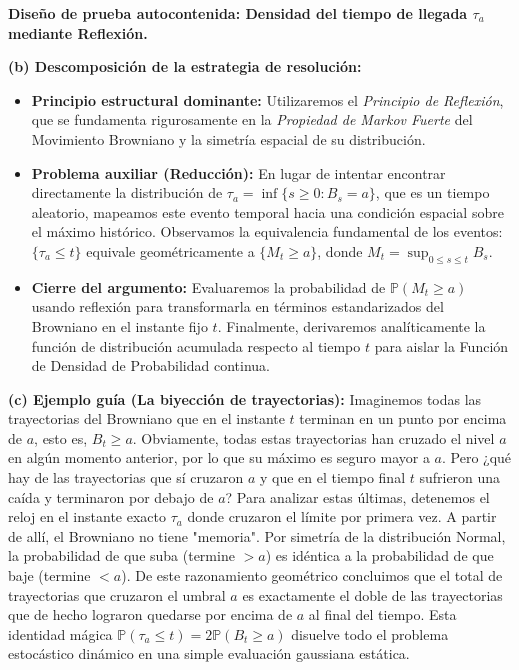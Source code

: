 \documentclass[11pt, letterpaper]{article}
\begin{document}
\begin{solucion}
    \textbf{Diseño de prueba autocontenida: Densidad del tiempo de llegada $\tau_a$ mediante Reflexión.}

    \textbf{(b) Descomposición de la estrategia de resolución:}
    \begin{itemize}
        \item[(i)] \textbf{Principio estructural dominante:} Utilizaremos el \textit{Principio de Reflexión}, que se fundamenta rigurosamente en la \textit{Propiedad de Markov Fuerte} del Movimiento Browniano y la simetría espacial de su distribución.
        \item[(ii)] \textbf{Problema auxiliar (Reducción):} En lugar de intentar encontrar directamente la distribución de $\tau_a = \inf\{s \ge 0 : B_s = a\}$, que es un tiempo aleatorio, mapeamos este evento temporal hacia una condición espacial sobre el máximo histórico. Observamos la equivalencia fundamental de los eventos: $\{\tau_a \le t\}$ equivale geométricamente a $\{M_t \ge a\}$, donde $M_t = \sup_{0 \le s \le t} B_s$. 
        \item[(iii)] \textbf{Cierre del argumento:} Evaluaremos la probabilidad de $\mathbb{P}(M_t \ge a)$ usando reflexión para transformarla en términos estandarizados del Browniano en el instante fijo $t$. Finalmente, derivaremos analíticamente la función de distribución acumulada respecto al tiempo $t$ para aislar la Función de Densidad de Probabilidad continua.
    \end{itemize}

    \vspace{3mm}
    \textbf{(c) Ejemplo guía (La biyección de trayectorias):}
    Imaginemos todas las trayectorias del Browniano que en el instante $t$ terminan en un punto por encima de $a$, esto es, $B_t \ge a$. Obviamente, todas estas trayectorias han cruzado el nivel $a$ en algún momento anterior, por lo que su máximo es seguro mayor a $a$. 
    Pero ¿qué hay de las trayectorias que sí cruzaron $a$ y que en el tiempo final $t$ sufrieron una caída y terminaron por debajo de $a$? Para analizar estas últimas, detenemos el reloj en el instante exacto $\tau_a$ donde cruzaron el límite por primera vez. A partir de allí, el Browniano no tiene "memoria". Por simetría de la distribución Normal, la probabilidad de que suba (termine $>a$) es idéntica a la probabilidad de que baje (termine $<a$). 
    De este razonamiento geométrico concluimos que el total de trayectorias que cruzaron el umbral $a$ es exactamente el doble de las trayectorias que de hecho lograron quedarse por encima de $a$ al final del tiempo. Esta identidad mágica $\mathbb{P}(\tau_a \le t) = 2\mathbb{P}(B_t \ge a)$ disuelve todo el problema estocástico dinámico en una simple evaluación gaussiana estática.


\end{solucion}
\end{document}
